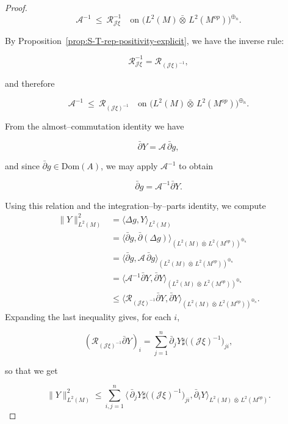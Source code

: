 \documentclass[10pt,a4paper,reqno]{amsart}
\newcommand{\Dom}{\mathrm{Dom}}
\begin{document}
\begin{proof}
\[
\mathcal{A}^{-1}\ \le\ \mathcal{R}_{\mathscr{J}\xi}^{-1}
\quad\text{on }\big(L^2(M){\bar\otimes}\,L^2(M^{op})\big)^{\oplus_n}.
\]


By Proposition~\ref{prop:S-T-rep-positivity-explicit}, we have the inverse rule:


\[
\mathcal{R}_{\mathscr{J}\xi}^{-1}
=
\mathcal{R}_{(\mathscr{J}\xi)^{-1}},
\]


and therefore


\[
\mathcal{A}^{-1}\ \le\ \mathcal{R}_{(\mathscr{J}\xi)^{-1}}
\quad\text{on }\big(L^2(M){\bar\otimes}\,L^2(M^{op})\big)^{\oplus_n}.
\]



From the almost–commutation identity we have


\[
\bar\partial Y=\mathcal{A}\,\bar\partial g,
\]


and since $\bar\partial g\in \Dom(A)$, we may apply $\mathcal{A}^{-1}$ to obtain


\[
\bar\partial g=\mathcal{A}^{-1}\bar\partial Y.
\]



\medskip
Using this relation and the integration–by–parts identity, we compute
\begin{align*}
\|Y\|_{L^2(M)}^2
&
=\big\langle \Delta g, Y\big\rangle_{L^2(M)}\\
&=\big\langle \bar\partial g, \bar\partial(\Delta g)\big\rangle_{(L^2(M)\,\bar\otimes\, L^2(M^{op}))^{\oplus_n}}\\
&=\big\langle \bar\partial g, \mathcal{A}\,\bar\partial g\big\rangle_{(L^2(M)\,\bar\otimes\, L^2(M^{op}))^{\oplus_n}}\\
&=\big\langle \mathcal{A}^{-1}\bar{\partial} Y, \bar{\partial} Y\big\rangle_{(L^2(M)\,\bar\otimes\, L^2(M^{op}))^{\oplus_n}}\\
&\le \big\langle \mathcal{R}_{(\mathscr{J}\xi)^{-1}}\bar{\partial} Y, \bar{\partial} Y\big\rangle_{(L^2(M)\,\bar\otimes\, L^2(M^{op}))^{\oplus_n}}.
\end{align*}
Expanding the last inequality gives, for each $i$,


\[
(\mathcal{R}_{(\mathscr{J}\xi)^{-1}}\bar\partial Y)_i
=
\sum_{j=1}^n \bar{\partial}_j Y\sharp\big((\mathscr{J}\xi)^{-1}\big)_{ji},
\]


so that we get


\[
\|Y\|_{L^2(M)}^2
\le
\sum_{i,j=1}^n
\Big\langle\,\bar{\partial}_j Y \sharp \big((\mathscr{J}\xi)^{-1}\big)_{ji} ,
\bar{\partial}_i Y\Big\rangle_{L^2(M)\,\bar\otimes\, L^2(M^{op})}.
\]




\end{proof}
\end{document}
